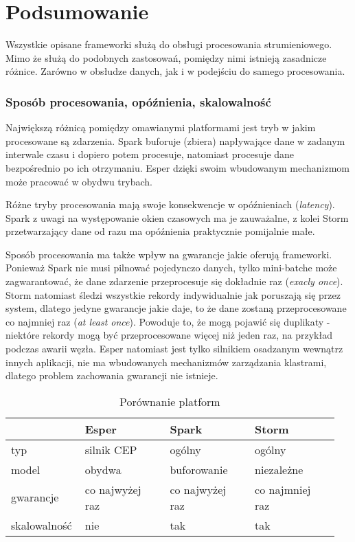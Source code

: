 \section{Podsumowanie}

Wszystkie opisane frameworki służą do obsługi procesowania strumieniowego.
Mimo że służą do podobnych zastosowań,
pomiędzy nimi istnieją zasadnicze różnice.
Zarówno w obsłudze danych,
jak i w podejściu do samego procesowania.

\subsubsection*{Sposób procesowania, opóźnienia, skalowalność}
Największą różnicą pomiędzy omawianymi platformami jest tryb w jakim procesowane są zdarzenia.
Spark buforuje (zbiera) napływające dane w zadanym interwale czasu i dopiero potem procesuje,
natomiast procesuje dane bezpośrednio po ich otrzymaniu.
Esper dzięki swoim wbudowanym mechanizmom może pracować w obydwu trybach.

Różne tryby procesowania mają swoje konsekwencje w opóźnieniach (\textit{latency}).
Spark z uwagi na występowanie okien czasowych ma je zauważalne,
z kolei Storm przetwarzający dane od razu ma opóźnienia praktycznie pomijalnie małe.

Sposób procesowania ma także wpływ na gwarancje jakie oferują frameworki.
Ponieważ Spark nie musi pilnować pojedynczo danych,
tylko mini-batche może zagwarantować,
że dane zdarzenie przeprocesuje się dokładnie raz (\textit{exacly once}).
Storm natomiast śledzi wszystkie rekordy indywidualnie jak poruszają się przez system,
dlatego jedyne gwarancje jakie daje,
to że dane zostaną przeprocesowane co najmniej raz (\textit{at least once}).
Powoduje to, że mogą pojawić się duplikaty - niektóre rekordy mogą być przeprocesowane więcej niż jeden raz,
na przykład podczas awarii węzła.
Esper natomiast jest tylko silnikiem osadzanym wewnątrz innych aplikacji,
nie ma wbudowanych mechanizmów zarządzania klastrami,
dlatego problem zachowania gwarancji nie istnieje.
\begin{table}[h]
  \label{tab:ModelComparison}
  \begin{tabular}{p{0.2\linewidth} p{0.25\linewidth} p{0.25\linewidth} p{0.25\linewidth}}
    & Esper & Spark & Storm \\
    \hline
    typ & silnik CEP & ogólny & ogólny \\
    model & obydwa & buforowanie & niezależne \\
    gwarancje & co najwyżej raz & co najwyżej raz & co najmniej raz \\
    skalowalność & nie & tak & tak \\
  \end{tabular}
  \caption{Porównanie platform}
\end{table}

